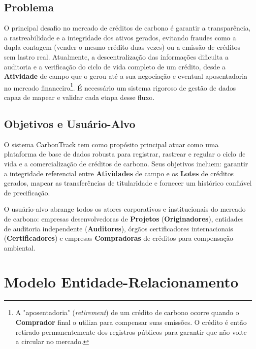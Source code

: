 \documentclass[12pt]{article}
\begin{document}
\subsection{Problema}
O principal desafio no mercado de créditos de carbono é garantir a transparência, a rastreabilidade e a integridade dos ativos gerados, evitando fraudes como a dupla contagem (vender o mesmo crédito duas vezes) ou a emissão de créditos sem lastro real. Atualmente, a descentralização das informações dificulta a auditoria e a verificação do ciclo de vida completo de um crédito, desde a \textbf{Atividade} de campo que o gerou até a sua negociação e eventual aposentadoria no mercado financeiro\footnote{A "aposentadoria" (\textit{retirement}) de um crédito de carbono ocorre quando o \textbf{Comprador} final o utiliza para compensar suas emissões. O crédito é então retirado permanentemente dos registros públicos para garantir que não volte a circular no mercado.}. É necessário um sistema rigoroso de gestão de dados capaz de mapear e validar cada etapa desse fluxo.

\subsection{Objetivos e Usuário-Alvo}
O sistema CarbonTrack tem como propósito principal atuar como uma plataforma de base de dados robusta para registrar, rastrear e regular o ciclo de vida e a comercialização de créditos de carbono. Seus objetivos incluem: garantir a integridade referencial entre \textbf{Atividades} de campo e os \textbf{Lotes} de créditos gerados, mapear as transferências de titularidade e fornecer um histórico confiável de precificação. 

O usuário-alvo abrange todos os atores corporativos e institucionais do mercado de carbono: empresas desenvolvedoras de \textbf{Projetos} (\textbf{Originadores}), entidades de auditoria independente (\textbf{Auditores}), órgãos certificadores internacionais (\textbf{Certificadores}) e empresas \textbf{Compradoras} de créditos para compensação ambiental.

\section{Modelo Entidade-Relacionamento}
\end{document}
